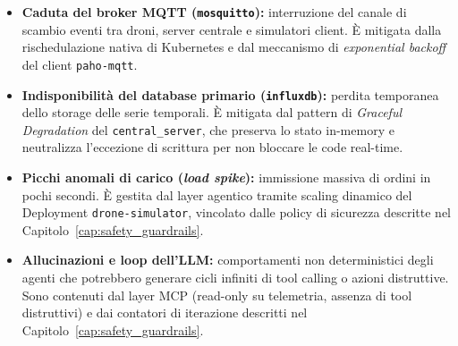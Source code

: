 \begin{itemize}
    \item \textbf{Caduta del broker MQTT (\texttt{mosquitto}):} interruzione del canale di scambio eventi tra droni, server centrale e simulatori client. È mitigata dalla rischedulazione nativa di Kubernetes e dal meccanismo di \textit{exponential backoff} del client \texttt{paho-mqtt}.
    \item \textbf{Indisponibilità del database primario (\texttt{influxdb}):} perdita temporanea dello storage delle serie temporali. È mitigata dal pattern di \textit{Graceful Degradation} del \texttt{central\_server}, che preserva lo stato in-memory e neutralizza l'eccezione di scrittura per non bloccare le code real-time.
    \item \textbf{Picchi anomali di carico (\textit{load spike}):} immissione massiva di ordini in pochi secondi. È gestita dal layer agentico tramite scaling dinamico del Deployment \texttt{drone-simulator}, vincolato dalle policy di sicurezza descritte nel Capitolo~\ref{cap:safety_guardrails}.
    \item \textbf{Allucinazioni e loop dell'LLM:} comportamenti non deterministici degli agenti che potrebbero generare cicli infiniti di tool calling o azioni distruttive. Sono contenuti dal layer MCP (read-only su telemetria, assenza di tool distruttivi) e dai contatori di iterazione descritti nel Capitolo~\ref{cap:safety_guardrails}.
\end{itemize}
